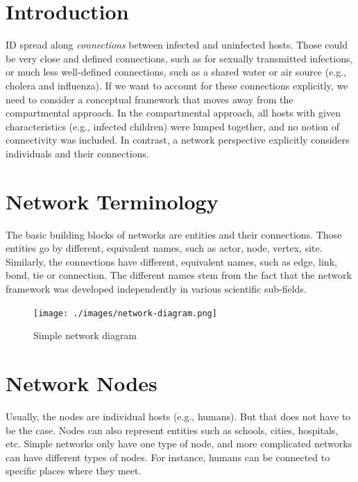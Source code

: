 \documentclass[
]{book}
\begin{document}
\hypertarget{introduction-17}{%
\section{Introduction}\label{introduction-17}}

ID spread along \emph{connections} between infected and uninfected hosts. Those could be very close and defined connections, such as for sexually transmitted infections, or much less well-defined connections, such as a shared water or air source (e.g., cholera and influenza). If we want to account for these connections explicitly, we need to consider a conceptual framework that moves away from the compartmental approach. In the compartmental approach, all hosts with given characteristics (e.g., infected children) were lumped together, and no notion of connectivity was included. In contrast, a network perspective explicitly considers individuals and their connections.

\hypertarget{network-terminology}{%
\section{Network Terminology}\label{network-terminology}}

The basic building blocks of networks are entities and their connections. Those entities go by different, equivalent names, such as actor, node, vertex, site. Similarly, the connections have different, equivalent names, such as edge, link, bond, tie or connection. The different names stem from the fact that the network framework was developed independently in various scientific sub-fields.

\begin{figure}
\centering
\texttt{[image: ./images/network-diagram.png]}
\caption{Simple network diagram}
\end{figure}

\hypertarget{network-nodes}{%
\section{Network Nodes}\label{network-nodes}}

Usually, the nodes are individual hosts (e.g., humans). But that does not have to be the case. Nodes can also represent entities such as schools, cities, hospitals, etc. Simple networks only have one type of node, and more complicated networks can have different types of nodes. For instance, humans can be connected to specific places where they meet.
\end{document}
